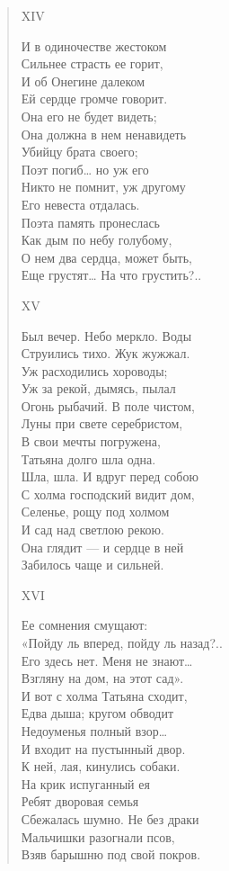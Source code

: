 \begin{verse}
XIV

И в одиночестве жестоком\\
Сильнее страсть ее горит,\\
И об Онегине далеком\\
Ей сердце громче говорит.\\
Она его не будет видеть;\\
Она должна в нем ненавидеть\\
Убийцу брата своего;\\
Поэт погиб… но уж его\\
Никто не помнит, уж другому\\
Его невеста отдалась.\\
Поэта память пронеслась\\
Как дым по небу голубому,\\
О нем два сердца, может быть,\\
Еще грустят… На что грустить?..

XV

Был вечер. Небо меркло. Воды\\
Струились тихо. Жук жужжал.\\
Уж расходились хороводы;\\
Уж за рекой, дымясь, пылал\\
Огонь рыбачий. В поле чистом,\\
Луны при свете серебристом,\\
В свои мечты погружена,\\
Татьяна долго шла одна.\\
Шла, шла. И вдруг перед собою\\
С холма господский видит дом,\\
Селенье, рощу под холмом\\
И сад над светлою рекою.\\
Она глядит — и сердце в ней\\
Забилось чаще и сильней.

XVI

Ее сомнения смущают:\\
«Пойду ль вперед, пойду ль назад?..\\
Его здесь нет. Меня не знают…\\
Взгляну на дом, на этот сад».\\
И вот с холма Татьяна сходит,\\
Едва дыша; кругом обводит\\
Недоуменья полный взор…\\
И входит на пустынный двор.\\
К ней, лая, кинулись собаки.\\
На крик испуганный ея\\
Ребят дворовая семья\\
Сбежалась шумно. Не без драки\\
Мальчишки разогнали псов,\\
Взяв барышню под свой покров.


\end{verse}
